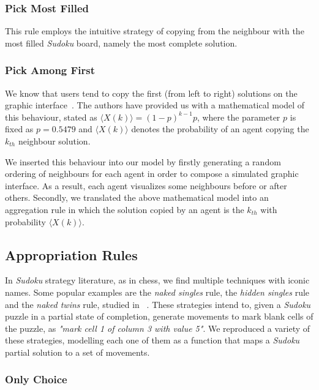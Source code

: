 \documentclass[letterpaper]{article}
\begin{document}
\subsubsection{Pick Most Filled}

This rule employs the intuitive strategy of copying from the neighbour with the most filled {\em Sudoku} board, namely the most complete solution.

\subsubsection{Pick Among First}

We know that users tend to copy the first (from left to right) solutions on the graphic interface~\cite{farenzena:collabem}. The authors have provided us with a mathematical model of this behaviour, stated as $\langle X(k)\rangle = (1-p)^{k-1}p$, where the parameter $p$ is fixed as $p = 0.5479$ and $\langle X(k)\rangle$ denotes the probability of an agent copying the $k_{th}$ neighbour solution.

We inserted this behaviour into our model by firstly generating a random ordering of neighbours for each agent in order to compose a simulated graphic interface. As a result, each agent visualizes some neighbours before or after others. Secondly, we translated the above mathematical model into an aggregation rule in which the solution copied by an agent is the $k_{th}$ with probability $\langle X(k)\rangle$.

\subsection{Appropriation Rules}

In {\em Sudoku} strategy literature, as in chess, we find multiple techniques with iconic names. Some popular examples are the {\em naked singles} rule, the {\em hidden singles} rule and the {\em naked twins} rule, studied in ~\cite{davis:mathsudoku}. These strategies intend to, given a {\em Sudoku} puzzle in a partial state of completion, generate movements to mark blank cells of the puzzle, as {\em "mark cell 1 of column 3 with value 5"}. We reproduced a variety of these strategies, modelling each one of them as a function that maps a {\em Sudoku} partial solution to a set of movements.

\subsubsection{Only Choice}
\end{document}
